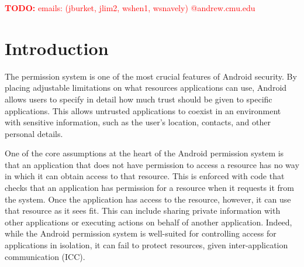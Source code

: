 \def\ttt{\texttt}
\def\trm{\textrm}
\def\tbf{\textbf}
\def\tsf{\textsf}

\newcommand{\itc}[1]{\textit{\it #1\/}}
\newcommand{\tup}[1]{\langle #1 \rangle}
\newcommand{\qt}[1]{\textrm{``}#1\textrm{''}}

\def\ttob{\texttt{\symbol{`\{}}}
\def\ttcb{\texttt{\symbol{`\}}}}
\newcommand{\ttc}[1]{\ttob{#1}\ttcb}

\newcommand{\src}{\ensuremath{\mathit{src}}}
\newcommand{\sink}{\ensuremath{\mathit{sink}}}
\newcommand{\TODO}[1]{\textcolor{red}{\tbf{TODO:} #1}}
\newcommand{\notes}[1]{\textcolor{red}{#1}}
\newcommand{\lori}[1]{\notes{$\stackrel{\hbox{\tiny Lori}}{\hbox{\tiny
        says}}$: #1}}
\newcommand{\wek}[1]{\notes{$\stackrel{\hbox{\tiny Will}}{\hbox{\tiny says}}$: #1}}

\def\lxor{\oplus}
\def\impl{\Rightarrow}
\def\bicond{\Leftrightarrow}

\def\True{\ttt{true}}
\def\False{\ttt{false}}
\def\ds{\displaystyle}

\nonfrenchspacing


\TODO{emails: (jburket, jlim2, wshen1, wsnavely) @andrew.cmu.edu}
\section{Introduction}
\label{sec:intro}
The permission system is one of the most crucial features of Android security. By placing adjustable limitations on what resources applications can use, Android allows users to specify in detail how much trust should be given to specific applications. This allows untrusted applications to coexist in an environment with sensitive information, such as the user's location, contacts, and other personal details. 

One of the core assumptions at the heart of the Android permission system is that an application that does not have permission to access a resource has no way in which it can obtain access to that resource. This is enforced with code that checks that an application has permission for a resource when it requests it from the system. Once the application has access to the resource, however, it can use that resource as it sees fit. This can include sharing private information with other applications or executing actions on behalf of another application. Indeed, while the Android permission system is well-suited for controlling access for applications in isolation, it can fail to protect resources, given inter-application communication (ICC).

